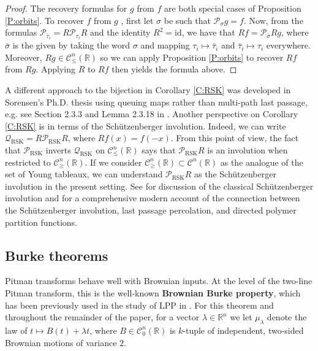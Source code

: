 \documentclass[11pt]{article}
\newcommand{\R}{\mathbb{R}}
\newcommand{\sig}{\sigma}
\newcommand{\la}{\lambda}
\newcommand{\cC}{\mathcal{C}}
\newcommand{\cP}{\mathcal{P}}
\newcommand{\cQ}{\mathcal{Q}}
\newcommand{\id}{\text{id}}
\theoremstyle{definition} %
\theoremstyle{remark} %
\begin{document}
\begin{proof}
The recovery formulas for $g$ from $f$ are both special cases of Proposition \ref{P:orbits}. To recover $f$ from $g$ , first let $\sig$ be such that $\cP_\sig g = f$. Now, from the formulas $\cP_{\bar \tau_i} = R \cP_{\tau_i} R$ and the identity $R^2 = \id$, we have that $Rf = \cP_{\bar \sig} Rg$, where $\bar \sig$ is the given by taking the word $\sig$ and mapping $\tau_i \mapsto \bar \tau_i$ and $\bar \tau_i \mapsto \tau_i$ everywhere. Moreover, $Rg \in \cC^n_\le(\R)$ so we can apply Proposition \ref{P:orbits} to recover $Rf$ from $Rg$. Applying $R$ to $Rf$ then yields the formula above. 
\end{proof}

A different approach to the bijection in Corollary \ref{C:RSK} was developed in Sorensen's Ph.D. thesis using queuing maps rather than multi-path last passage, e.g. see Section 2.3.3 and Lemma 2.3.18 in \cite{sorensen2023stationary}. Another perspective on Corollary \ref{C:RSK} is in terms of the Sch\"utzenberger involution. Indeed, we can write $\cQ_{\operatorname{RSK}} = R \cP_{\operatorname{RSK}} R$, where $R f(x) = f(-x)$. From this point of view, the fact that $\cP_{\operatorname{RSK}}$ inverts $\cQ_{\operatorname{RSK}}$ on $\cC^n_\le(\R)$ says that $\cP_{\operatorname{RSK}} R$ is an involution when restricted to $\cC^n_\ge(\R)$. If we consider $\cC^n_\ge(\R) \subset \cC^n(\R)$ as the analogue of the set of Young tableaux, we can understand $\cP_{\operatorname{RSK}} R$ as the Sch\"utzenberger involution in the present setting. See \cite[Appendix A]{fulton1997young} for discussion of the classical Sch\"utzenberger involution and \cite{bisi2021geometric} for a comprehensive modern account of the connection between the Sch\"utzenberger involution, last passage percolation, and directed polymer partition functions.

\subsection{Burke theorems}
\label{S:burke-theorems}

Pitman transforms behave well with Brownian inputs. At the level of the two-line Pitman transform, this is the well-known \textbf{Brownian Burke property}, which has been previously used in the study of LPP in \cite{o2001brownian, seppalainen2023busemann, seppalainen2023global}. For this theorem and throughout the remainder of the paper, for a vector $\la \in \R^n$ we let $\mu_\la$ denote the law of $t \mapsto B(t) + \la t$, where $B \in \cC^n_0(\R)$ is $k$-tuple of independent, two-sided Brownian motions of variance $2$. 
\end{document}
